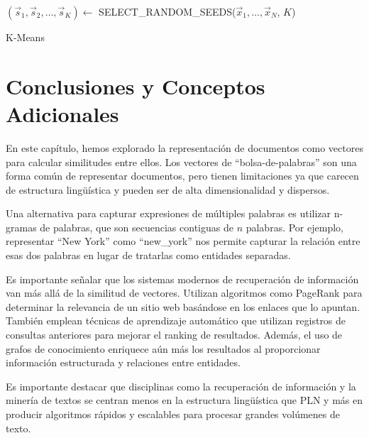 \begin{algorithm}[H]
    $(\vec{s}_1, \vec{s}_2, \ldots, \vec{s}_K) \leftarrow$ SELECT\_RANDOM\_SEEDS($\vec{x}_1, \ldots, \vec{x}_N$, $K$)\;
    \;
    \caption{K-Means}\label{algo:kmeans}
\end{algorithm}

\section{Conclusiones y Conceptos Adicionales}

En este capítulo, hemos explorado la representación de documentos como vectores para calcular similitudes entre ellos. Los vectores de ``bolsa-de-palabras'' son una forma común de representar documentos, pero tienen limitaciones ya que carecen de estructura lingüística y pueden ser de alta dimensionalidad y dispersos.

Una alternativa para capturar expresiones de múltiples palabras es utilizar n-gramas de palabras, que son secuencias contiguas de $n$ palabras. Por ejemplo, representar ``New York'' como ``new\_york'' nos permite capturar la relación entre esas dos palabras en lugar de tratarlas como entidades separadas.

Es importante señalar que los sistemas modernos de recuperación de información van más allá de la similitud de vectores. Utilizan algoritmos como PageRank \cite{page1998pagerank} para determinar la relevancia de un sitio web basándose en los enlaces que lo apuntan. También emplean técnicas de aprendizaje automático que utilizan registros de consultas anteriores para mejorar el ranking de resultados. Además, el uso de grafos de conocimiento enriquece aún más los resultados al proporcionar información estructurada y relaciones entre entidades.

Es importante destacar que disciplinas como la recuperación de información y la minería de textos se centran menos en la estructura lingüística que PLN y más en producir algoritmos rápidos y escalables para procesar grandes volúmenes de texto.
